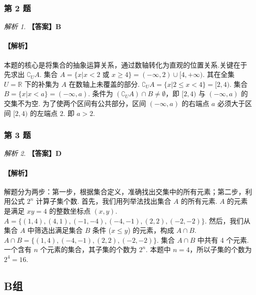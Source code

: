 \documentclass[12pt,a4paper]{ctexbook}
\theoremstyle{definition}
\theoremstyle{remark}
\newtheorem*{solution}{解析}
\begin{document}
	\subsubsection*{第 2 题}
	\begin{solution}
		\textbf{【答案】B}
		\paragraph{【解析】}
		本题的核心是将集合的抽象运算关系，通过数轴转化为直观的位置关系.关键在于先求出 $∁_U A$.
		集合 $A = \{x|x<2 \text{ 或 } x \ge 4\} = (-\infty, 2) \cup [4, +\infty)$.
		其在全集 $U=\mathbb{R}$ 下的补集为 $A$ 在数轴上未覆盖的部分.
		$∁_U A = \{x|2 \le x < 4\} = [2, 4)$.
		集合 $B = \{x|x<a\} = (-\infty, a)$.
		条件为 $(∁_U A) \cap B \neq \emptyset$，即 $[2, 4)$ 与 $(-\infty, a)$ 的交集不为空.
		为了使两个区间有公共部分，区间 $(-\infty, a)$ 的右端点 $a$ 必须大于区间 $[2,4)$ 的左端点 $2$.
		即 $a > 2$.
	\end{solution}
	
	\subsubsection*{第 3 题}
	\begin{solution}
		\textbf{【答案】D}
		\paragraph{【解析】}
		解题分为两步：第一步，根据集合定义，准确找出交集中的所有元素；第二步，利用公式 $2^n$ 计算子集个数.
		首先，我们用列举法找出集合 $A$ 的所有元素.
		$A$ 的元素是满足 $xy=4$ 的整数坐标点 $(x,y)$.
		$A = \{(1,4), (4,1), (-1,-4), (-4,-1), (2,2), (-2,-2)\}$.
		然后，我们从集合 $A$ 中筛选出满足集合 $B$ 条件 ($x \le y$) 的元素，构成 $A \cap B$.
		$A \cap B = \{(1,4), (-4,-1), (2,2), (-2,-2)\}$.
		集合 $A \cap B$ 中共有 4 个元素.
		一个含有 $n$ 个元素的集合，其子集的个数为 $2^n$.
		本题中 $n=4$，所以子集的个数为 $2^4 = 16$.
	\end{solution}
	
	\subsection*{B组}
	
\end{document}
